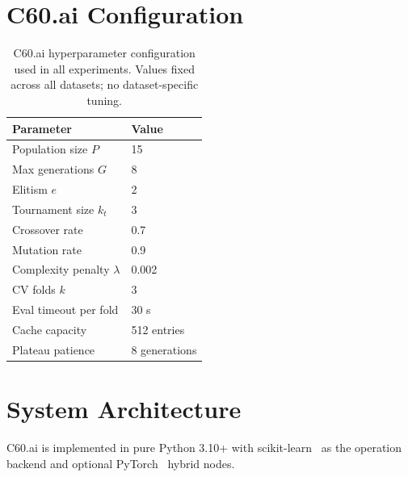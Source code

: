 \documentclass{article}
\theoremstyle{definition}
\theoremstyle{plain}
\theoremstyle{remark}
\begin{document}
\section{C60.ai Configuration}
\label{app:config}

\begin{table}[H]
  \caption{C60.ai hyperparameter configuration used in all experiments.
    Values fixed across all datasets; no dataset-specific tuning.}
  \label{tab:config}
  \begin{center}
    \begin{small}
      \begin{tabular}{ll}
        \toprule
        Parameter                    & Value          \\
        \midrule
        Population size $P$          & 15             \\
        Max generations $G$          & 8              \\
        Elitism $e$                  & 2              \\
        Tournament size $k_t$        & 3              \\
        Crossover rate               & 0.7            \\
        Mutation rate                & 0.9            \\
        Complexity penalty $\lambda$ & 0.002          \\
        CV folds $k$                 & 3              \\
        Eval timeout per fold        & 30 s           \\
        Cache capacity               & 512 entries    \\
        Plateau patience             & 8 generations  \\
        \bottomrule
      \end{tabular}
    \end{small}
  \end{center}
\end{table}

\section{System Architecture}
\label{app:arch}

C60.ai is implemented in pure Python 3.10+ with
scikit-learn~\cite{pedregosa2011scikit} as the operation backend and
optional PyTorch~\cite{paszke2019pytorch} hybrid nodes.
\end{document}
